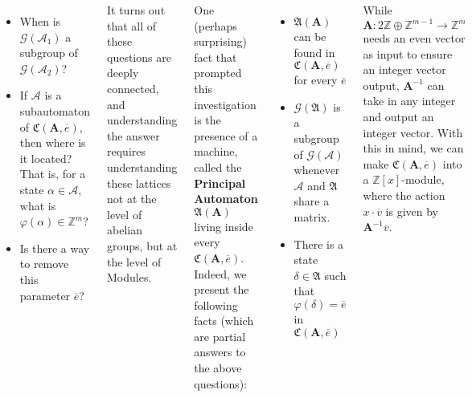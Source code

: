 \documentclass[24pt]{tikzposter}
\theoremstyle{definition}
\newcommand{\Z}{\mathbb{Z}}
\begin{document}
\begin{columns}
{\begin{itemize}
      \item When is $\mathcal{G}(\mathcal{A}_1)$ a subgroup of 
        $\mathcal{G}(\mathcal{A}_2)$?

      \item If $\mathcal{A}$ is a subautomaton of 
        $\mathfrak{C}(\mathbf{A}, \overline{e})$, then where is it located?
        That is, for a state $\alpha \in \mathcal{A}$, what is 
        $\varphi(\alpha) \in \Z^m$?

      \item Is there a way to remove this parameter $\overline{e}$?
    \end{itemize}

    \bigskip

    It turns out that all of these questions are deeply connected, and
    understanding the answer requires understanding these lattices not
    at the level of abelian groups, but at the level of Modules.
  }

  {
    One (perhaps surprising) fact that prompted this investigation is the
    presence of a machine, called the \textbf{Principal Automaton} 
    $\mathfrak{A}(\mathbf{A})$ living inside every 
    $\mathfrak{C}(\mathbf{A},\overline{e})$. Indeed, we present the following
    facts (which are partial answers to the above questions):

    \bigskip

    \begin{itemize}
      \item $\mathfrak{A}(\mathbf{A})$ can be found in 
        $\mathfrak{C}(\mathbf{A}, \overline{e})$ for every $\overline{e}$

      \item $\mathcal{G}(\mathfrak{A})$ is a subgroup of 
        $\mathcal{G}(\mathcal{A})$ whenever $\mathcal{A}$ and $\mathfrak{A}$
        share a matrix.

      \item There is a state $\delta \in \mathfrak{A}$ such that
        $\varphi(\delta) = \overline{e}$ in 
        $\mathfrak{C}(\mathbf{A}, \overline{e})$
    \end{itemize}
  }

  {
    While $\mathbf{A} : 2 \Z \oplus \Z^{m-1} \to \Z^m$ needs an even vector
    as input to ensure an integer vector output, $\mathbf{A}^{-1}$ can take
    in any integer and output an integer vector. With this in mind, we can
    make $\mathfrak{C}(\mathbf{A},\overline{e})$ into a 
    $\mathbb{Z}[x]$-module, where the action $x \cdot \overline{v}$ is 
    given by $\mathbf{A}^{-1} \overline{v}$.

}
\end{columns}
\end{document}
